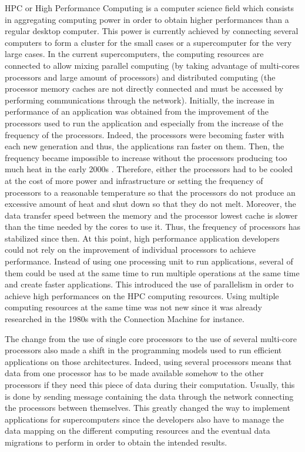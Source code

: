 HPC or High Performance Computing is a computer science field which consists in aggregating computing power in order to obtain higher performances than a regular desktop computer.
This power is currently achieved by connecting several computers to form a cluster for the small cases or a supercomputer for the very large cases.
In the current supercomputers, the computing resources are connected to allow mixing parallel computing (by taking advantage of multi-cores processors and large amount of processors) and distributed computing (the processor memory caches are not directly connected and must be accessed by performing communications through the network).
Initially, the increase in performance of an application was obtained from the improvement of the processors used to run the application and especially from the increase of the frequency of the processors.
Indeed, the processors were becoming faster with each new generation and thus, the applications ran faster on them.
Then, the frequency became impossible to increase without the processors producing too much heat in the early 2000s \cite{KirkH2010}.
Therefore, either the processors had to be cooled at the cost of more power and infrastructure or setting the frequency of processors to a reasonable temperature so that the processors do not produce an excessive amount of heat and shut down so that they do not melt.
Moreover, the data transfer speed between the memory and the processor lowest cache is slower than the time needed by the cores to use it.
Thus, the frequency of processors has stabilized since then.
At this point, high performance application developers could not rely on the improvement of individual processors to achieve performance.
Instead of using one processing unit to run applications, several of them could be used at the same time to run multiple operations at the same time and create faster applications.
This introduced the use of parallelism in order to achieve high performances on the HPC computing resources.
Using multiple computing resources at the same time was not new since it was already researched in the 1980s with the Connection Machine \cite{Hilli1989phd} for instance.

The change from the use of single core processors to the use of several multi-core processors also made a shift in the programming models used to run efficient applications on those architectures.
Indeed, using several processors means that data from one processor has to be made available somehow to the other processors if they need this piece of data during their computation.
Usually, this is done by sending message containing the data through the network connecting the processors between themselves.
This greatly changed the way to implement applications for supercomputers since the developers also have to manage the data mapping on the different computing resources and the eventual data migrations to perform in order to obtain the intended results.

